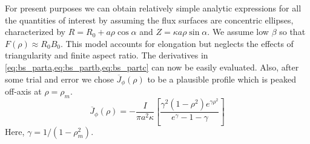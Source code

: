For present purposes we can obtain relatively simple analytic expressions for all the quantities of interest by assuming the flux surfaces are concentric ellipses, characterized by $R = R _ { 0 } + a \rho \cos \alpha$ and $Z = \kappa a \rho \sin \alpha$. We assume low $\beta$ so that $F ( \rho ) \approx R _ { 0 } B _ { 0 }$. This model accounts for elongation but neglects the effects of triangularity and finite aspect ratio. The derivatives in \cref{eq:bs_parta,eq:bs_partb,eq:bs_partc} can now be easily evaluated. Also, after some trial and error we chose $\overline { J } _ { \phi } ( \rho )$ to be a plausible profile which is peaked off-axis at $\rho = \rho_m$.
\begin{equation}
	\overline { J } _ { \phi } ( \rho ) = - \frac { I } { \pi a ^ { 2 } \kappa } \left[ \frac { \gamma ^ { 2 } \left( 1 - \rho ^ { 2 } \right) e ^ { \gamma \rho ^ { 2 } } } { e ^ { \gamma } - 1 - \gamma } \right]
\end{equation}
Here, $\gamma = 1 / ( 1 - \rho_m^2 )$. 

